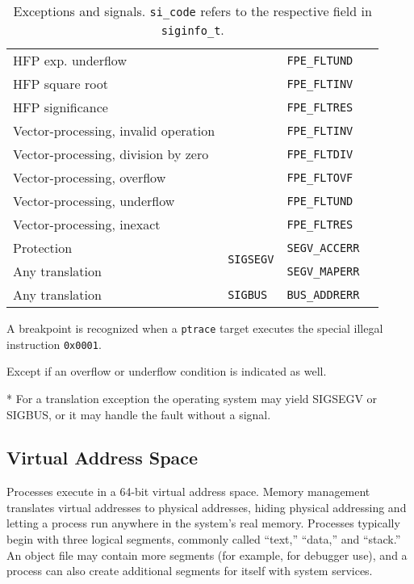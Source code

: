 \documentclass[english,11pt,twoside,toc=bib,toc=idx]{scrreprt}
\newcommand{\ADDRBITS}{64}
\newcommand{\ADDRBITS}{31}
\newenvironment{DIFnomarkup}{}{} %
\begin{document}
\begin{table}
\begin{DIFnomarkup}
\begin{threeparttable}
\begin{tabular}{llll}
      HFP exp\@. underflow & & \texttt{FPE\_FLTUND} \\
      HFP square root & & \texttt{FPE\_FLTINV} \\
      HFP significance & & \texttt{FPE\_FLTRES} \\
      Vector-processing, invalid operation & & \texttt{FPE\_FLTINV} \\
      Vector-processing, division by zero & & \texttt{FPE\_FLTDIV} \\
      Vector-processing, overflow & & \texttt{FPE\_FLTOVF} \\
      Vector-processing, underflow & & \texttt{FPE\_FLTUND} \\
      Vector-processing, inexact & & \texttt{FPE\_FLTRES} \\
      \midrule
      Protection
      & \multirow{2}{*}{\texttt{SIGSEGV}} & \texttt{SEGV\_ACCERR} \\
      Any translation\tnote{*} & & \texttt{SEGV\_MAPERR} \\
      \midrule
      Any translation\tnote{*} & \texttt{SIGBUS} & \texttt{BUS\_ADDRERR} \\
      \bottomrule
    \end{tabular}
    \medskip
    \begin{tablenotes}
    \item [\dagger] A breakpoint is recognized when a
      \texttt{ptrace} target executes the special illegal instruction
      \texttt{0x0001}.
    \item [\ddagger] Except if an overflow or underflow condition is
      indicated as well.
    \item [*] For a translation exception the operating system may yield
      SIGSEGV or SIGBUS, or it may handle the fault without a signal.
    \end{tablenotes}
  \end{threeparttable}
  \end{DIFnomarkup}
  \caption[Exceptions and signals]{Exceptions and signals.
    \texttt{si\_code} refers to the respective field in
    \texttt{siginfo\_t}.}
  \label{tab:exceptions}
\end{table}

\subsection{Virtual Address Space}
Processes execute in a \ADDRBITS{}-bit virtual address
space.  Memory management translates virtual addresses to physical
addresses, hiding physical addressing and letting a process run
anywhere in the system's real memory.  Processes typically begin with
three logical segments, commonly called ``text,'' ``data,'' and
``stack.''  An object file may contain more segments (for example, for
debugger use), and a process can also create additional segments for
itself with system services.
\end{document}
